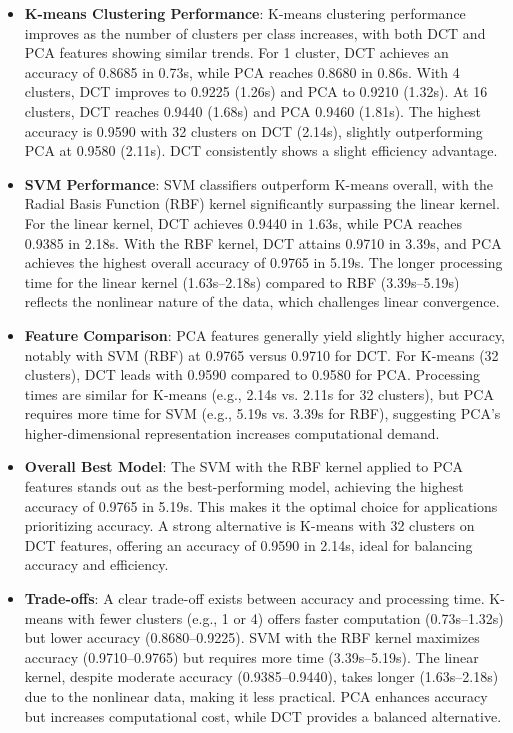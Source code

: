 \documentclass[12pt]{article}
\begin{document}
\begin{itemize}
    \item \textbf{K-means Clustering Performance}:  
    K-means clustering performance improves as the number of clusters per class increases, with both DCT and PCA features showing similar trends. For 1 cluster, DCT achieves an accuracy of 0.8685 in 0.73s, while PCA reaches 0.8680 in 0.86s. With 4 clusters, DCT improves to 0.9225 (1.26s) and PCA to 0.9210 (1.32s). At 16 clusters, DCT reaches 0.9440 (1.68s) and PCA 0.9460 (1.81s). The highest accuracy is 0.9590 with 32 clusters on DCT (2.14s), slightly outperforming PCA at 0.9580 (2.11s). DCT consistently shows a slight efficiency advantage.

    \item \textbf{SVM Performance}:  
    SVM classifiers outperform K-means overall, with the Radial Basis Function (RBF) kernel significantly surpassing the linear kernel. For the linear kernel, DCT achieves 0.9440 in 1.63s, while PCA reaches 0.9385 in 2.18s. With the RBF kernel, DCT attains 0.9710 in 3.39s, and PCA achieves the highest overall accuracy of 0.9765 in 5.19s. The longer processing time for the linear kernel (1.63s–2.18s) compared to RBF (3.39s–5.19s) reflects the nonlinear nature of the data, which challenges linear convergence.

    \item \textbf{Feature Comparison}:  
    PCA features generally yield slightly higher accuracy, notably with SVM (RBF) at 0.9765 versus 0.9710 for DCT. For K-means (32 clusters), DCT leads with 0.9590 compared to 0.9580 for PCA. Processing times are similar for K-means (e.g., 2.14s vs. 2.11s for 32 clusters), but PCA requires more time for SVM (e.g., 5.19s vs. 3.39s for RBF), suggesting PCA’s higher-dimensional representation increases computational demand.

    \item \textbf{Overall Best Model}:  
    The SVM with the RBF kernel applied to PCA features stands out as the best-performing model, achieving the highest accuracy of 0.9765 in 5.19s. This makes it the optimal choice for applications prioritizing accuracy. A strong alternative is K-means with 32 clusters on DCT features, offering an accuracy of 0.9590 in 2.14s, ideal for balancing accuracy and efficiency.

    \item \textbf{Trade-offs}:  
    A clear trade-off exists between accuracy and processing time. K-means with fewer clusters (e.g., 1 or 4) offers faster computation (0.73s–1.32s) but lower accuracy (0.8680–0.9225). SVM with the RBF kernel maximizes accuracy (0.9710–0.9765) but requires more time (3.39s–5.19s). The linear kernel, despite moderate accuracy (0.9385–0.9440), takes longer (1.63s–2.18s) due to the nonlinear data, making it less practical. PCA enhances accuracy but increases computational cost, while DCT provides a balanced alternative.
\end{itemize}
\end{document}
